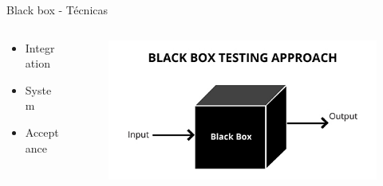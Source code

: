 \documentclass[aspectratio=169]{beamer}
\begin{document}
\begin{frame}{Black box - Técnicas}
\begin{columns}[T]
	\begin{column}[T]{4cm}
		\begin{itemize}
			\item Integration
			\item System
			\item Acceptance
		\end{itemize}
	\end{column}
	\begin{column}[T]{6cm} %
		\begin{figure}
			\centering
			\includegraphics[width=\linewidth]{Images/blackboxtesting.jpg}
		\end{figure}
	\end{column}
\end{columns}
\end{frame}
\end{document}
